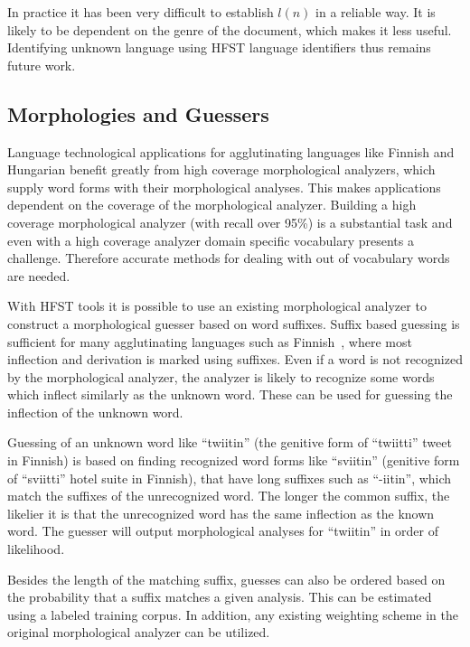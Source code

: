 \documentclass{llncs}
\begin{document}
In practice it has been very difficult to establish $l(n)$ in a
reliable way. It is likely to be dependent on the genre of the
document, which makes it less useful. Identifying unknown language
using HFST language identifiers thus remains future work.

\subsection{Morphologies and Guessers}
\label{sec: morph-guessers}

Language technological applications for agglutinating languages like
Finnish and Hungarian benefit greatly from high coverage morphological
analyzers, which supply word forms with their morphological
analyses. This makes applications dependent on the coverage of the
morphological analyzer. Building a high coverage morphological
analyzer (with recall over 95\%) is a substantial task and even with a
high coverage analyzer domain specific vocabulary presents a
challenge. Therefore accurate methods for dealing with out of
vocabulary words are needed.

With HFST tools it is possible to use an existing morphological
analyzer to construct a morphological guesser based on word
suffixes. Suffix based guessing is sufficient for many agglutinating
languages such as Finnish~\cite{linden/2009/nodalida}, where most
inflection and derivation is marked using suffixes. Even if a word is
not recognized by the morphological analyzer, the analyzer is likely
to recognize some words which inflect similarly as the unknown
word. These can be used for guessing the inflection of the unknown
word.

Guessing of an unknown word like ``twiitin'' (the genitive form of
``twiitti'' tweet in Finnish) is based on finding recognized word
forms like ``sviitin'' (genitive form of ``sviitti'' hotel suite in
Finnish), that have long suffixes such as ``-iitin'', which match the
suffixes of the unrecognized word. The longer the common suffix, the
likelier it is that the unrecognized word has the same inflection as
the known word. The guesser will output morphological analyses for
``twiitin'' in order of likelihood.

Besides the length of the matching suffix, guesses can also be ordered
based on the probability that a suffix matches a given analysis. This
can be estimated using a labeled training corpus. In addition, any
existing weighting scheme in the original morphological analyzer can
be utilized.
\end{document}
